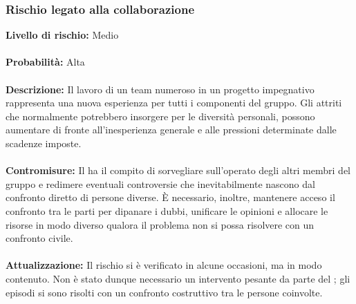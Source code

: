 	\subsubsection{Rischio legato alla collaborazione}
	\label{AnalisiDeiRischi_Organizzazione}
		\textbf{Livello di rischio:} Medio
		\\ \\
		\textbf{Probabilità:} Alta
		\\ \\
		\textbf{Descrizione:} Il lavoro di un team numeroso in un progetto impegnativo rappresenta una nuova esperienza per tutti i componenti del gruppo. Gli attriti che normalmente potrebbero insorgere per le diversità personali, possono aumentare di fronte all'inesperienza generale e alle pressioni determinate dalle scadenze imposte.
		\\ \\
		\textbf{Contromisure:} Il \projectManager{} ha il compito di sorvegliare sull'operato degli altri membri del gruppo e redimere eventuali controversie che inevitabilmente nascono dal confronto diretto di persone diverse. È necessario, inoltre, mantenere acceso il confronto tra le parti per dipanare i dubbi, unificare le opinioni e allocare le risorse in modo diverso qualora il problema non si possa risolvere con un confronto civile.
		\\ \\
		\textbf{Attualizzazione:} Il rischio si è verificato in alcune occasioni, ma in modo contenuto. Non è stato dunque necessario un intervento pesante da parte del \projectManager{}; gli episodi si sono risolti con un confronto costruttivo tra le persone coinvolte.  
		 
